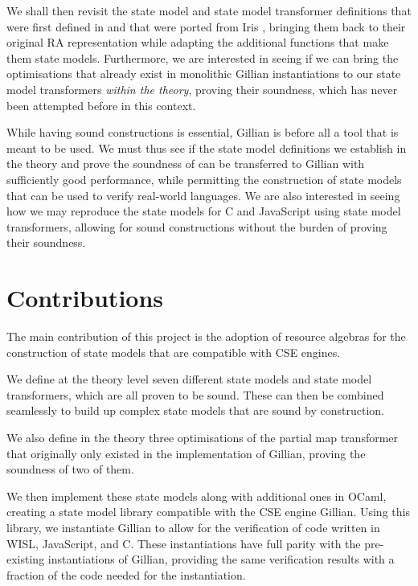We shall then revisit the state model and state model transformer definitions that were first defined in \cite{sacha-phd} and that were ported from Iris \cite{iris}, bringing them back to their original RA representation while adapting the additional functions that make them state models. Furthermore, we are interested in seeing if we can bring the optimisations that already exist in monolithic Gillian instantiations to our state model transformers \emph{within the theory}, proving their soundness, which has never been attempted before in this context.

While having sound constructions is essential, Gillian is before all a tool that is meant to be used. We must thus see if the state model definitions we establish in the theory and prove the soundness of can be transferred to Gillian with sufficiently good performance, while permitting the construction of state models that can be used to verify real-world languages. We are also interested in seeing how we may reproduce the state models for C and JavaScript using state model transformers, allowing for sound constructions without the burden of proving their soundness.

\section{Contributions}

The main contribution of this project is the adoption of resource algebras for the construction of state models that are compatible with CSE engines.

We define at the theory level seven different state models and state model transformers, which are all proven to be sound. These can then be combined seamlessly to build up complex state models that are sound by construction.

We also define in the theory three optimisations of the partial map transformer that originally only existed in the implementation of Gillian, proving the soundness of two of them.

We then implement these state models along with additional ones in OCaml, creating a state model library compatible with the CSE engine Gillian. Using this library, we instantiate Gillian to allow for the verification of code written in WISL, JavaScript, and C. These instantiations have full parity with the pre-existing instantiations of Gillian, providing the same verification results with a fraction of the code needed for the instantiation.


